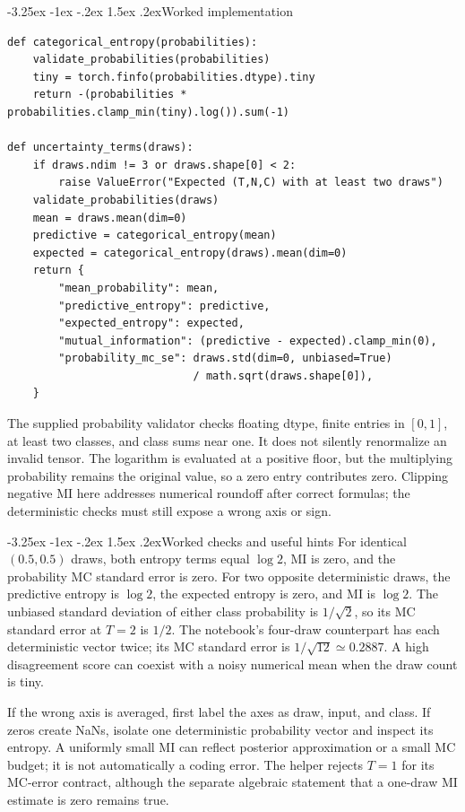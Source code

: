 \documentclass[11pt,a4paper]{article}
\makeatletter
\renewcommand\subsection{\@startsection{subsection}{2}{\z@}%
  {-3.25ex \@plus -1ex \@minus -.2ex}%
  {1.5ex \@plus .2ex}{\normalfont\large}}
\makeatother
\begin{document}
\subsection{Worked implementation}
\begin{lstlisting}
def categorical_entropy(probabilities):
    validate_probabilities(probabilities)
    tiny = torch.finfo(probabilities.dtype).tiny
    return -(probabilities * probabilities.clamp_min(tiny).log()).sum(-1)

def uncertainty_terms(draws):
    if draws.ndim != 3 or draws.shape[0] < 2:
        raise ValueError("Expected (T,N,C) with at least two draws")
    validate_probabilities(draws)
    mean = draws.mean(dim=0)
    predictive = categorical_entropy(mean)
    expected = categorical_entropy(draws).mean(dim=0)
    return {
        "mean_probability": mean,
        "predictive_entropy": predictive,
        "expected_entropy": expected,
        "mutual_information": (predictive - expected).clamp_min(0),
        "probability_mc_se": draws.std(dim=0, unbiased=True)
                             / math.sqrt(draws.shape[0]),
    }
\end{lstlisting}
The supplied probability validator checks floating dtype, finite entries in
$[0,1]$, at least two classes, and class sums near one. It does not silently
renormalize an invalid tensor. The logarithm is evaluated at a positive floor,
but the multiplying
probability remains the original value, so a zero entry contributes zero.
Clipping negative MI here addresses numerical roundoff after correct formulas;
the deterministic checks must still expose a wrong axis or sign.

\subsection{Worked checks and useful hints}
For identical $(0.5,0.5)$ draws, both entropy terms equal $\log2$, MI is zero,
and the probability MC standard error is zero. For two opposite deterministic
draws, the predictive entropy is $\log2$, the expected entropy is zero, and
MI is $\log2$. The unbiased standard deviation of either class probability
is $1/\sqrt2$, so its MC standard error at $T=2$ is $1/2$. The notebook's four-draw counterpart has each deterministic vector twice;
its MC standard error is $1/\sqrt{12}\simeq0.2887$. A high disagreement score
can coexist with a noisy numerical mean when the draw count is tiny.

If the wrong axis is averaged, first label the axes as draw, input, and class.
If zeros create NaNs, isolate one deterministic probability vector and inspect
its entropy. A uniformly small MI can reflect posterior approximation or a
small MC budget; it is not automatically a coding error. The helper rejects
$T=1$ for its MC-error contract, although the separate algebraic statement
that a one-draw MI estimate is zero remains true.
\end{document}
